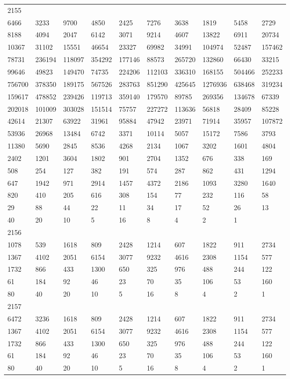 \begin{longtable}{*{10}{l}}
2155&&&&&&&&&\\
6466& 3233& 9700& 4850& 2425& 7276& 3638& 1819& 5458& 2729\\
8188& 4094& 2047& 6142& 3071& 9214& 4607& 13822& 6911& 20734\\
10367& 31102& 15551& 46654& 23327& 69982& 34991& 104974& 52487& 157462\\
78731& 236194& 118097& 354292& 177146& 88573& 265720& 132860& 66430& 33215\\
99646& 49823& 149470& 74735& 224206& 112103& 336310& 168155& 504466& 252233\\
756700& 378350& 189175& 567526& 283763& 851290& 425645& 1276936& 638468& 319234\\
159617& 478852& 239426& 119713& 359140& 179570& 89785& 269356& 134678& 67339\\
202018& 101009& 303028& 151514& 75757& 227272& 113636& 56818& 28409& 85228\\
42614& 21307& 63922& 31961& 95884& 47942& 23971& 71914& 35957& 107872\\
53936& 26968& 13484& 6742& 3371& 10114& 5057& 15172& 7586& 3793\\
11380& 5690& 2845& 8536& 4268& 2134& 1067& 3202& 1601& 4804\\
2402& 1201& 3604& 1802& 901& 2704& 1352& 676& 338& 169\\
508& 254& 127& 382& 191& 574& 287& 862& 431& 1294\\
647& 1942& 971& 2914& 1457& 4372& 2186& 1093& 3280& 1640\\
820& 410& 205& 616& 308& 154& 77& 232& 116& 58\\
29& 88& 44& 22& 11& 34& 17& 52& 26& 13\\
40& 20& 10& 5& 16& 8& 4& 2& 1& \\

2156&&&&&&&&&\\
1078& 539& 1618& 809& 2428& 1214& 607& 1822& 911& 2734\\
1367& 4102& 2051& 6154& 3077& 9232& 4616& 2308& 1154& 577\\
1732& 866& 433& 1300& 650& 325& 976& 488& 244& 122\\
61& 184& 92& 46& 23& 70& 35& 106& 53& 160\\
80& 40& 20& 10& 5& 16& 8& 4& 2& 1\\

2157&&&&&&&&&\\
6472& 3236& 1618& 809& 2428& 1214& 607& 1822& 911& 2734\\
1367& 4102& 2051& 6154& 3077& 9232& 4616& 2308& 1154& 577\\
1732& 866& 433& 1300& 650& 325& 976& 488& 244& 122\\
61& 184& 92& 46& 23& 70& 35& 106& 53& 160\\
80& 40& 20& 10& 5& 16& 8& 4& 2& 1\\


\end{longtable}
